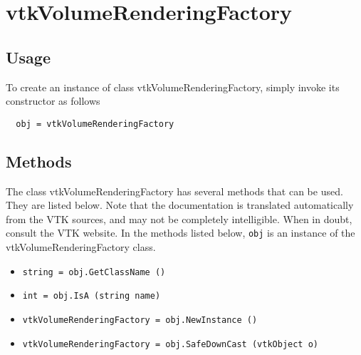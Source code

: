 \section{vtkVolumeRenderingFactory}

\subsection{Usage}


To create an instance of class vtkVolumeRenderingFactory, simply
invoke its constructor as follows
\begin{verbatim}
  obj = vtkVolumeRenderingFactory
\end{verbatim}
\subsection{Methods}

The class vtkVolumeRenderingFactory has several methods that can be used.
  They are listed below.
Note that the documentation is translated automatically from the VTK sources,
and may not be completely intelligible.  When in doubt, consult the VTK website.
In the methods listed below, \verb|obj| is an instance of the vtkVolumeRenderingFactory class.
\begin{itemize}
\item  \verb|string = obj.GetClassName ()|

\item  \verb|int = obj.IsA (string name)|

\item  \verb|vtkVolumeRenderingFactory = obj.NewInstance ()|

\item  \verb|vtkVolumeRenderingFactory = obj.SafeDownCast (vtkObject o)|

\end{itemize}
